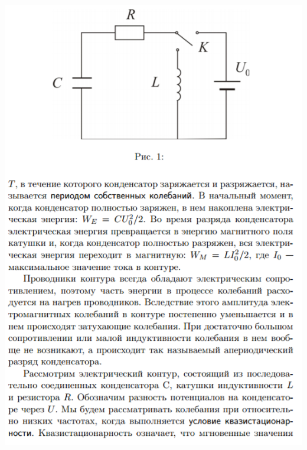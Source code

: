 \documentclass[12pt]{article}
\begin{document}
\begin{center}
       	\includegraphics[width=15cm]{theory2.png}

\end{center}
\end{document}
